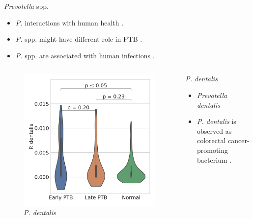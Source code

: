 \documentclass{beamer}
\begin{document}
\begin{frame}[allowframebreaks]
        \begin{block}{\textit{Prevotella} spp.}
            \begin{itemize}
                \item \textit{P.} interactions with human health \cite{Prevotella-1}.
                \item \textit{P.} spp. might have different role in PTB \cite{Prevotella-2}.
                \item \textit{P.} spp. are associated with human infections \cite{Prevotella-4}.
            \end{itemize}
        \end{block}
        \pagebreak

        \begin{columns}
            \begin{column}{0.4 \linewidth}
                \begin{figure}
                    \includegraphics[width=\linewidth]{figures/Step71_Proportion/everything.DADA2.homd.Mouth/P. dentalis.pdf}
                    \caption{\textit{P. dentalis}}
                \end{figure}
            \end{column}
            \begin{column}{0.6 \linewidth}
                \begin{block}{\textit{P. dentalis}}
                    \begin{itemize}
                        \item \textit{Prevotella dentalis}
                        \item \textit{P. dentalis} is observed as colorectal cancer-promoting bacterium \cite{Prevotella-3}.
                    \end{itemize}
                \end{block}
            \end{column}
        \end{columns}


\end{frame}
\end{document}
